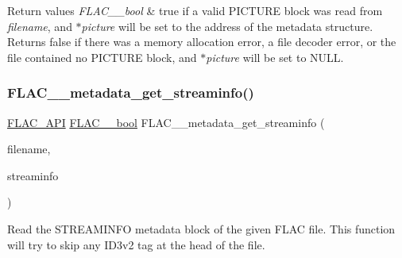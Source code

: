 \begin{DoxyRetVals}{Return values}
{\em F\+L\+A\+C\+\_\+\+\_\+bool} & {\ttfamily true} if a valid P\+I\+C\+T\+U\+RE block was read from {\itshape filename}, and {\itshape $\ast$picture} will be set to the address of the metadata structure. Returns {\ttfamily false} if there was a memory allocation error, a file decoder error, or the file contained no P\+I\+C\+T\+U\+RE block, and {\itshape $\ast$picture} will be set to {\ttfamily N\+U\+LL}. \\
\hline
\end{DoxyRetVals}
\mbox{\label{group__flac__metadata__level0_gaf248d1ccc8025b9e9d7f532b8af4ab07}} 
\subsubsection{\texorpdfstring{FLAC\_\_metadata\_get\_streaminfo()}{FLAC\_\_metadata\_get\_streaminfo()}}
{\footnotesize\ttfamily \mbox{\hyperlink{group__flac__export_ga56ca07df8a23310707732b1c0007d6f5}{F\+L\+A\+C\+\_\+\+A\+PI}} \mbox{\hyperlink{ordinals_8h_a95103469f1cbd78b8cf250194985b34e}{F\+L\+A\+C\+\_\+\+\_\+bool}} F\+L\+A\+C\+\_\+\+\_\+metadata\+\_\+get\+\_\+streaminfo (\begin{DoxyParamCaption}\item[{const char $\ast$}]{filename,  }\item[{\mbox{\hyperlink{struct_f_l_a_c_____stream_metadata}{F\+L\+A\+C\+\_\+\+\_\+\+Stream\+Metadata}} $\ast$}]{streaminfo }\end{DoxyParamCaption})}

Read the S\+T\+R\+E\+A\+M\+I\+N\+FO metadata block of the given F\+L\+AC file. This function will try to skip any I\+D3v2 tag at the head of the file.


